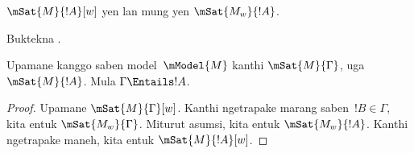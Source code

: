 \documentclass[../../../include/open-logic-section]{subfiles}
\begin{document}
\begin{prop}
  $\mSat{M}{!A}[w]$ yen lan mung yen $\mSat{M_w}{!A}$.
\end{prop}

\begin{prob}
  Buktekna .
\end{prob}

\begin{prop}
  Upamane kanggo saben model~$\mModel{M}$ kanthi $\mSat{M}{\Gamma}$,
  uga $\mSat{M}{!A}$. Mula $\Gamma \Entails !A$.
\end{prop}

\begin{proof}
  Upamane $\mSat{M}{\Gamma}[w]$. Kanthi ngetrapake 
  marang saben~$!B \in \Gamma$, kita entuk $\mSat{M_w}{\Gamma}$.
  Miturut asumsi, kita entuk $\mSat{M_w}{!A}$. Kanthi ngetrapake
   maneh, kita entuk $\mSat{M}{!A}[w]$.
\end{proof}
\end{document}
